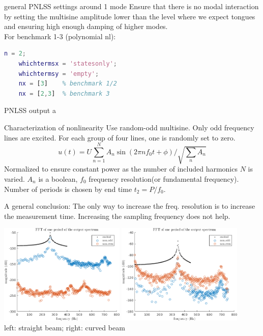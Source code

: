 \documentclass[9pt]{beamer}
\begin{document}
\begin{frame}[fragile]{general PNLSS settings around 1 mode}
  Ensure that there is no modal interaction by setting the multisine amplitude
  lower than the level where we expect tongues and ensuring high
  enough damping of higher modes.\\
  For benchmark 1-3 (polynomial nl):

  \begin{lstlisting}[language=matlab]
    n = 2;
    whichtermsx = 'statesonly';
    whichtermsy = 'empty';
    nx = [3]    % benchmark 1/2
    nx = [2,3]  % benchmark 3
  \end{lstlisting}
\end{frame}


\begin{frame}{PNLSS output}
  a
\end{frame}


\begin{frame}{Characterization of nonlinearity}
  Use random-odd multisine. Only odd frequency lines are excited. For each group
  of four lines, one is randomly set to zero.
  \begin{equation}
    \label{eq:multisine}
    u(t) = U \sum_{n=1}^N A_n \sin(2\pi nf_0t + \phi) / \textstyle \sqrt{\sum_n A_n}
  \end{equation}
  Normalized to ensure constant power as the number of included harmonics $N$ is
  varied. $A_n$ is a boolean, $f_0$ frequency resolution(or fundamental
  frequency). Number of periods is chosen by end time $t_2=P/f_0$.

  A general conclusion: The only way to increase the freq. resolution is to
  increase the measurement time. Increasing the sampling frequency does not
  help.

    \begin{center}
      \includegraphics[width=0.45\textwidth]{fig/ms_nl_detection_b2}
      \includegraphics[width=0.45\textwidth]{fig/ms_nl_detection_b3}\\
      left: straight beam; right: curved beam
    \end{center}
\end{frame}
\end{document}
